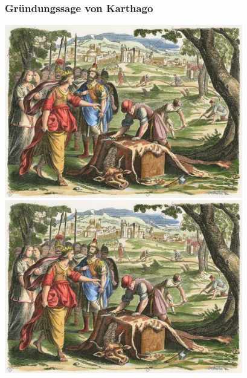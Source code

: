 %
%
%
\bgroup
\begin{frame}[t]
\setlength{\abovedisplayskip}{5pt}
\setlength{\belowdisplayskip}{5pt}
\frametitle{Gründungssage von Karthago}
\begin{center}
\includegraphics[width=10.4cm]{../slides/3/dido.jpg}
\includegraphics[width=10.4cm]{../../buch/chapters/050-nebenbedingungen/images/dido.jpg}
\end{center}
\end{frame}
\egroup
